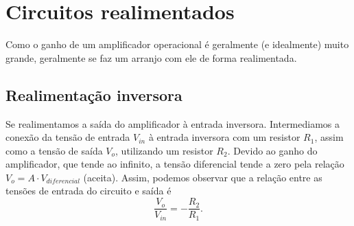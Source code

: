 
\section*{Circuitos realimentados}

Como o ganho de um amplificador operacional é geralmente (e idealmente) muito grande, geralmente se faz um arranjo com ele de forma realimentada.

\subsection*{Realimentação inversora}

Se realimentamos a saída do amplificador à entrada inversora. Intermediamos a conexão da tensão de entrada $V_{in}$ à entrada inversora com um resistor $R_1$, assim como a tensão de saída $V_o$, utilizando um resistor $R_2$. Devido ao ganho do amplificador, que tende ao infinito, a tensão diferencial tende a zero pela relação $V_o = A\cdot V_{diferencial}$ (aceita). Assim, podemos observar que a relação entre as tensões de entrada do circuito e saída é \[
\frac{V_o}{V_{in}} = - \frac{R_2}{R_1}
.\] 


